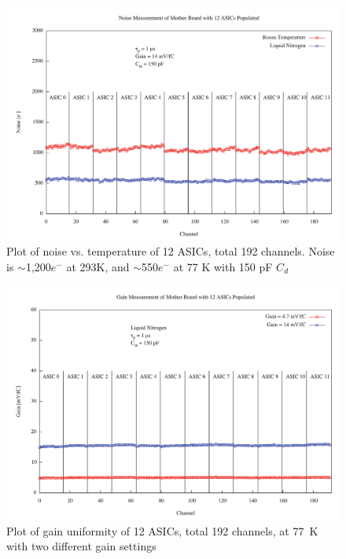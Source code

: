\begin{figure}[hbt]
\begin{center}
\includegraphics[scale=0.4]{figures/noise.pdf}
\end{center}
\caption{\label{fig:fignoise}Plot of noise vs. temperature of 12 ASICs, total 192 channels. Noise is $\sim$1,200$e^{-}$ at 293K, and $\sim$550$e^{-}$ at 77 K with 150 pF $C_{d}$}
\end{figure}

\begin{figure}[hbt]
\begin{center}
\includegraphics[scale=0.4]{figures/gain.pdf}
\end{center}
\caption{\label{fig:figgain}Plot of gain uniformity of 12 ASICs, total 192 channels, at 77~K with two different gain settings}
\end{figure}

